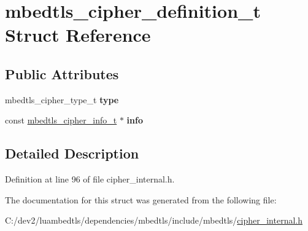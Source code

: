 \hypertarget{structmbedtls__cipher__definition__t}{\section{mbedtls\-\_\-cipher\-\_\-definition\-\_\-t Struct Reference}
\label{structmbedtls__cipher__definition__t}
}
\subsection*{Public Attributes}
\begin{DoxyCompactItemize}
\item 
\hypertarget{structmbedtls__cipher__definition__t_a243ed1741dacc6a6b9281737022d43ff}{mbedtls\-\_\-cipher\-\_\-type\-\_\-t {\bfseries type}}\label{structmbedtls__cipher__definition__t_a243ed1741dacc6a6b9281737022d43ff}

\item 
\hypertarget{structmbedtls__cipher__definition__t_ad3fb3d04325ef02d9f04db18f87d544c}{const \hyperlink{structmbedtls__cipher__info__t}{mbedtls\-\_\-cipher\-\_\-info\-\_\-t} $\ast$ {\bfseries info}}\label{structmbedtls__cipher__definition__t_ad3fb3d04325ef02d9f04db18f87d544c}

\end{DoxyCompactItemize}


\subsection{Detailed Description}


Definition at line 96 of file cipher\-\_\-internal.\-h.



The documentation for this struct was generated from the following file\-:\begin{DoxyCompactItemize}
\item 
C\-:/dev2/luambedtls/dependencies/mbedtls/include/mbedtls/\hyperlink{cipher__internal_8h}{cipher\-\_\-internal.\-h}\end{DoxyCompactItemize}
